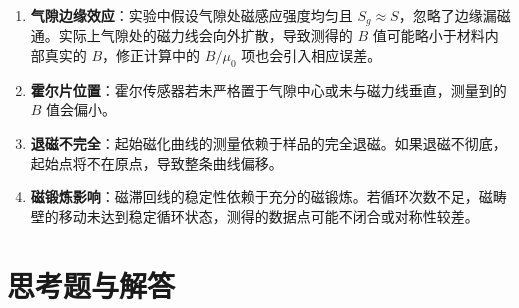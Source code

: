 \documentclass[11pt]{article}
\begin{document}
\begin{enumerate}
    \item \textbf{气隙边缘效应}：实验中假设气隙处磁感应强度均匀且 $S_g \approx S$，忽略了边缘漏磁通。实际上气隙处的磁力线会向外扩散，导致测得的 $B$ 值可能略小于材料内部真实的 $B$，修正计算中的 $B/\mu_0$ 项也会引入相应误差。
    \item \textbf{霍尔片位置}：霍尔传感器若未严格置于气隙中心或未与磁力线垂直，测量到的 $B$ 值会偏小。
    \item \textbf{退磁不完全}：起始磁化曲线的测量依赖于样品的完全退磁。如果退磁不彻底，起始点将不在原点，导致整条曲线偏移。
    \item \textbf{磁锻炼影响}：磁滞回线的稳定性依赖于充分的磁锻炼。若循环次数不足，磁畴壁的移动未达到稳定循环状态，测得的数据点可能不闭合或对称性较差。
\end{enumerate}

\section{思考题与解答}
\end{document}
